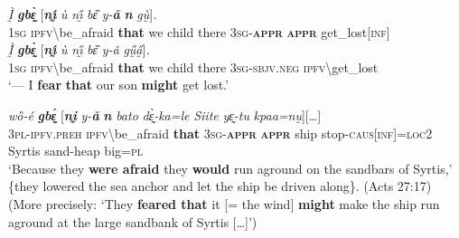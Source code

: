 \documentclass[output=paper,colorlinks,citecolor=brown]{langscibook}
\begin{document}
\ea \label{ex:Fed37}
\ea \label{ex:Fed37a}
\gll \textit{Ḭ̀} \textit{\textbf{gbɛ̰̀}} \textup{[}\textit{\textbf{nı̰́}} \textit{ù} \textit{nı̰̋} \textit{bɛ̏} \textit{y-\textbf{ǎ}} \textit{\textbf{n{\ù}}} \textit{gṵ̀{\à}}\textup{]}\textit{.}\\
\textsc{1sg} \textsc{ipfv}\backslash be\_afraid \textbf{that} we child there \textsc{3sg-\textbf{appr}} \textsc{\textbf{appr}} get\_lost\textsc{[inf]} \\
\ex \label{ex:Fed37b}
\gll \textit{Ḭ̀} \textit{\textbf{gbɛ̰̀}} \textup{[}\textit{\textbf{nı̰́}} \textit{ù} \textit{nı̰̋} \textit{bɛ̏} \textit{y-ǎ} \textit{gṵ̋a̰̋}\textup{]}\textit{.} \\
\textsc{1sg} \textsc{ipfv}\backslash be\_afraid \textbf{that} we child there \textsc{3sg-sbjv.neg} \textsc{ipfv}\backslash get\_lost \\
 `--- I \textbf{fear} \textbf{that} our son \textbf{might} get lost.'
\z
\z


\ea \label{ex:Fed38}
\gll {\textup{[}\dots\textup{]}} \textit{wȍ-é} \textit{\textbf{gbɛ̰́}} \textup{[}\textit{\textbf{nḭ}} \textit{y-\textbf{ǎ}} \textit{\textbf{n{\ù}}} \textit{bato} \textit{dɛ̰̀-ka=le} \textit{Siite} \textit{yɛ̰-tu} \textit{kpaa=nṵ}\textup{]}{\textup{[}\dots\textup{]}}  \\
{} \textsc{3pl-ipfv.preh} \textsc{ipfv}\backslash be\_afraid \textbf{that} \textsc{3sg-\textbf{appr}} \textsc{\textbf{appr}} ship stop-\textsc{caus[inf]=loc2} Syrtis sand-heap big=\textsc{pl} \\
\glt `Because they \textbf{were afraid} they \textbf{would} run aground on the sandbars of Syrtis,' \{they lowered the sea anchor and let the ship be driven along\}. (Acts 27:17) \\
(More precisely: `They \textbf{feared that} it [= the wind] \textbf{might} make the ship run aground at the large sandbank of Syrtis [\dots]')
\z
\end{document}

